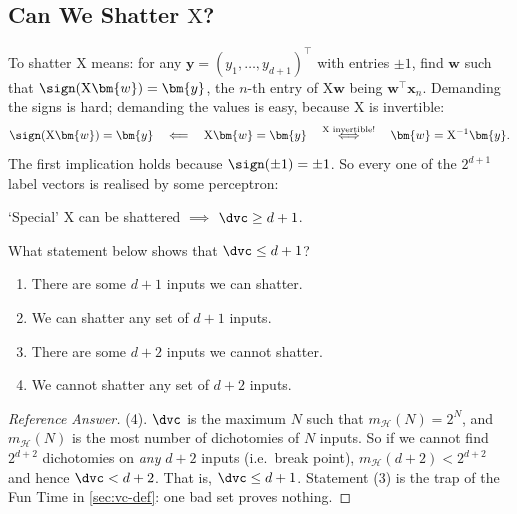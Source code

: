 \subsection{Can We Shatter \texorpdfstring{\(\mathrm{X}\)}{X}?}

To shatter \(\mathrm{X}\) means: for any
\(\bm{y} = (y_1, \dots , y_{d+1})^\top\) with entries \(\pm 1\), find \(\bm{w}\)
such that \(\sign(\mathrm{X} \bm{w}) = \bm{y}\), the \(n\)-th entry of
\(\mathrm{X}\bm{w}\) being \(\bm{w}^\top \bm{x}_n\). Demanding the signs is
hard; demanding the values is easy, because \(\mathrm{X}\) is invertible:
\[
    \sign(\mathrm{X} \bm{w}) = \bm{y}
    \quad\Longleftarrow\quad
    \mathrm{X} \bm{w} = \bm{y}
    \quad\overset{\mathrm{X} \text{ invertible!}}{\iff}\quad
    \bm{w} = \mathrm{X}^{-1} \bm{y} .
\]
The first implication holds because \(\sign(\pm 1) = \pm 1\). So every one of
the \(2^{d+1}\) label vectors is realised by some perceptron:

\begin{moral}
    `Special' \(\mathrm{X}\) can be shattered \(\implies\) \(\dvc \ge d + 1\).
\end{moral}

\begin{exercise}
    What statement below shows that \(\dvc \le d + 1\)?
    \begin{enumerate}[(1)]
        \item There are some \(d + 1\) inputs we can shatter.
        \item We can shatter any set of \(d + 1\) inputs.
        \item There are some \(d + 2\) inputs we cannot shatter.
        \item We cannot shatter any set of \(d + 2\) inputs.
    \end{enumerate}
\end{exercise}

\begin{proof}[Reference Answer]
    (4). \(\dvc\) is the maximum \(N\) such that \(m_{\mathcal{H}}(N) = 2^N\),
    and \(m_{\mathcal{H}}(N)\) is the most number of dichotomies of \(N\)
    inputs. So if we cannot find \(2^{d+2}\) dichotomies on \emph{any}
    \(d + 2\) inputs (i.e.\ break point), \(m_{\mathcal{H}}(d + 2) < 2^{d+2}\)
    and hence \(\dvc < d + 2\). That is, \(\dvc \le d + 1\). Statement (3) is the
    trap of the Fun Time in \autoref{sec:vc-def}: one bad set proves nothing.
\end{proof}


